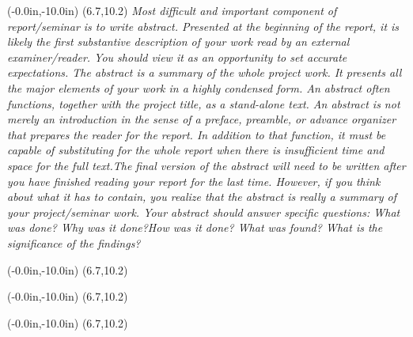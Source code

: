 \documentclass{SNJB}
\begin{document}
\acknowledgeauthor


\newpage
\thisfancyput(-0.0in,-10.0in){
\setlength{\unitlength}{1in}\framebox(6.7,10.2)}
\emph{Most difficult and important component of report/seminar is to write abstract. Presented at the
beginning of the report, it is likely the first substantive description of your work read by an external
examiner/reader. You should view it as an opportunity to set accurate expectations. The abstract is a
summary of the whole project work.
It presents all the major elements of your work in a highly condensed form. An abstract often
functions, together with the project title, as a stand-alone text. An abstract is not merely an
introduction in the sense of a preface, preamble, or advance organizer that prepares the reader for the
report.
In addition to that function, it must be capable of substituting for the whole report when there is
insufficient time and space for the full text.The final version of the abstract will need to be written
after you have finished reading your report for the last time. However, if you think about what it has
to contain, you realize that the abstract is really a summary of your project/seminar work.
Your abstract should answer specific questions: What was done? Why was it done?How was it
done? What was found? What is the significance of the findings?}





\newpage
\thisfancyput(-0.0in,-10.0in){%
\setlength{\unitlength}{1in}\framebox(6.7,10.2)}

\afterpreface

\newpage
\thisfancyput(-0.0in,-10.0in){%
\setlength{\unitlength}{1in}\framebox(6.7,10.2)}
\listoftables

\newpage
\thisfancyput(-0.0in,-10.0in){%
\setlength{\unitlength}{1in}\framebox(6.7,10.2)}
\listoffigures
%
\clearpage
{}
\pagestyle{plain}


\pagestyle{fancy}
\end{document}
